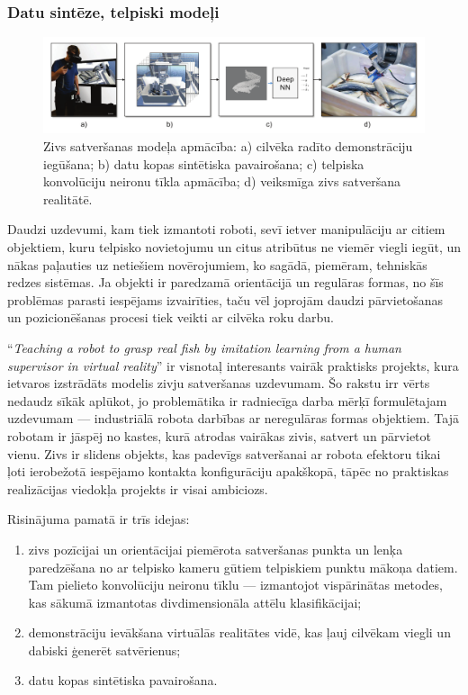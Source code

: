 \documentclass[12pt, a4paper]{article}
\numberwithin{equation}{section} %
\begin{document}
\subsubsection{Datu sintēze, telpiski modeļi}

\begin{figure}[t!]
    \centering
    \includegraphics[width=16cm]{../img/fish.png}
    \caption{Zivs satveršanas modeļa apmācība: a) cilvēka radīto demonstrāciju iegūšana; b) datu kopas sintētiska pavairošana; c) telpiska konvolūciju neironu tīkla apmācība; d) veiksmīga zivs satveršana realitātē. \cite{dyrstad2018teaching}}
\end{figure}

Daudzi uzdevumi, kam tiek izmantoti roboti, sevī ietver manipulāciju ar citiem objektiem, kuru telpisko novietojumu un citus atribūtus ne viemēr viegli iegūt, un nākas paļauties uz netiešiem novērojumiem, ko sagādā, piemēram, tehniskās redzes sistēmas. Ja objekti ir paredzamā orientācijā un regulāras formas, no šīs problēmas parasti iespējams izvairīties, taču vēl joprojām daudzi pārvietošanas un pozicionēšanas procesi tiek veikti ar cilvēka roku darbu.

``\textit{Teaching a robot to grasp real fish by imitation learning from a human supervisor in virtual reality}'' \cite{dyrstad2018teaching} ir visnotaļ interesants vairāk praktisks projekts, kura ietvaros izstrādāts modelis zivju satveršanas uzdevumam. Šo rakstu irr vērts nedaudz sīkāk aplūkot, jo problemātika ir radniecīga darba mērķī formulētajam uzdevumam --- industriālā robota darbības ar neregulāras formas objektiem. Tajā robotam ir jāspēj no kastes, kurā atrodas vairākas zivis, satvert un pārvietot vienu. Zivs ir slidens objekts, kas padevīgs satveršanai ar robota efektoru tikai ļoti ierobežotā iespējamo kontakta konfigurāciju apakškopā, tāpēc no praktiskas realizācijas viedokļa projekts ir visai ambiciozs. 

Risinājuma pamatā ir trīs idejas:

\begin{enumerate}
    \item zivs pozīcijai un orientācijai piemērota satveršanas punkta un lenķa paredzēšana no ar telpisko kameru gūtiem telpiskiem punktu mākoņa datiem. Tam pielieto konvolūciju neironu tīklu --- izmantojot vispārinātas metodes, kas sākumā izmantotas divdimensionāla attēlu klasifikācijai;
    \item demonstrāciju ievākšana virtuālās realitātes vidē, kas ļauj cilvēkam viegli un dabiski ģenerēt satvērienus;
    \item datu kopas sintētiska pavairošana.
\end{enumerate}
\end{document}
